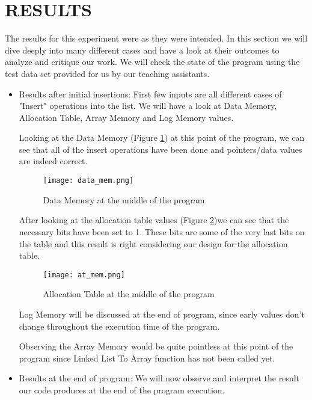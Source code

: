 \documentclass[pdftex,12pt,a4paper]{article}
\begin{document}
\section{RESULTS}
The results for this experiment were as they were intended. In this section we will dive deeply into many different cases and have a look at their outcomes to analyze and critique our work.
\newline We will check the state of the program using the test data set provided for us by our teaching assistants. 
\begin{itemize}
    \item Results after initial insertions: First few inputs are all different cases of "Insert" operations into the list. We will have a look at Data Memory, Allocation Table, Array Memory and Log Memory values.
    
    \newline Looking at the Data Memory (Figure \ref{fig:data_mem}) at this point of the program, we can see that all of the insert operations have been done and pointers/data values are indeed correct.
    \begin{figure}[H]
    \centering
    \texttt{[image: data\_mem.png]}
    \caption{Data Memory at the middle of the program}
    \label{fig:data_mem}
    \end{figure}
    
    
    
    After looking at the allocation table values (Figure \ref{fig:at_mem})we can see that the necessary bits have been set to 1. These bits are some of the very last bits on the table and this result is right considering our design for the allocation table.
    \begin{figure}[H]
    \centering
    \texttt{[image: at\_mem.png]}
    \caption{Allocation Table at the middle of the program}
    \label{fig:at_mem}
    \end{figure}


    Log Memory will be discussed at the end of program, since early values don't change throughout the execution time of the program.
    
    Observing the Array Memory would be quite pointless at this point of the program since Linked List To Array function has not been called yet.
    
    \item Results at the end of program: We will now observe and interpret the result our code produces at the end of the program execution. 


\end{itemize}
\end{document}
